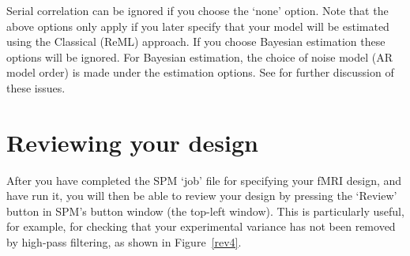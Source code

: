 \documentclass[a4paper,titlepage]{book}
\begin{document}
                                                                                                            

Serial correlation can be ignored if you choose the `none' option. Note that the above options only apply if you later specify that your model will be estimated using the Classical (ReML) approach. If you choose Bayesian estimation these options will be ignored. For Bayesian estimation, the choice of noise model (AR model order) is made under the estimation options. See \cite{peb1,vb_fmri_ar} for further discussion of 
these issues.

\section{Reviewing your design \label{explore}}

After you have completed the SPM `job' file for specifying your 
fMRI design, and have run it, you will then be able to review your 
design by pressing the `Review' button in SPM's button window (the 
top-left window). This is particularly useful, for example, for 
checking that your experimental variance has not been removed  
by high-pass filtering, as shown in Figure~\ref{rev4}.
\end{document}

